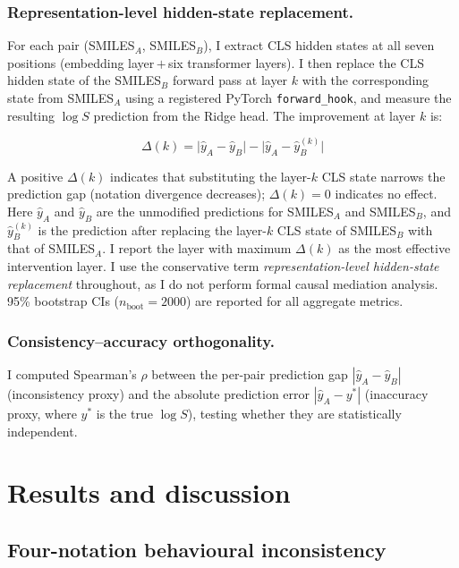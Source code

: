 \documentclass[twoside,twocolumn,9pt]{article}
\newcommand{\logS}{\ensuremath{\log S}}
\begin{document}
\subsubsection{Representation-level hidden-state replacement.~~} For each pair (SMILES$_A$, SMILES$_B$), I extract CLS hidden states at all seven positions (embedding layer\,$+$\,six transformer layers). I then replace the CLS hidden state of the SMILES$_B$ forward pass at layer $k$ with the corresponding state from SMILES$_A$ using a registered PyTorch \texttt{forward\_hook}, and measure the resulting $\logS$ prediction from the Ridge head. The improvement at layer $k$ is:

\begin{equation}
  \Delta(k) = \bigl|\hat{y}_A - \hat{y}_B\bigr| - \bigl|\hat{y}_A - \hat{y}_{B}^{(k)}\bigr|
  \label{eq:improvement}
\end{equation}

A positive $\Delta(k)$ indicates that substituting the layer-$k$ CLS state narrows the prediction gap (notation divergence decreases); $\Delta(k)=0$ indicates no effect. Here $\hat{y}_A$ and $\hat{y}_B$ are the unmodified predictions for SMILES$_A$ and SMILES$_B$, and $\hat{y}_{B}^{(k)}$ is the prediction after replacing the layer-$k$ CLS state of SMILES$_B$ with that of SMILES$_A$. I report the layer with maximum $\Delta(k)$ as the most effective intervention layer. I use the conservative term \textit{representation-level hidden-state replacement} throughout, as I do not perform formal causal mediation analysis. 95\% bootstrap CIs ($n_\text{boot}=2000$) are reported for all aggregate metrics.

\subsubsection{Consistency--accuracy orthogonality.~~} I computed Spearman's $\rho$ between the per-pair prediction gap $|\hat{y}_A - \hat{y}_B|$ (inconsistency proxy) and the absolute prediction error $|\hat{y}_A - y^\ast|$ (inaccuracy proxy, where $y^\ast$ is the true $\logS$), testing whether they are statistically independent.

\section{Results and discussion}

\subsection{Four-notation behavioural inconsistency}
\end{document}
